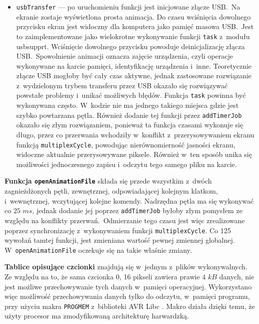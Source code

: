 \begin{itemize}
	\item \texttt{usbTransfer} --- po uruchomieniu funkcji jest inicjowane złącze USB.~Na ekranie zostaje wyświetlona prosta animacja. Do czasu wciśnięcia dowolnego przycisku ekran jest widoczny dla komputera jako pamięć masowa USB.~Jest to zaimplementowane jako wielokrotne wykonywanie funkcji \texttt{task} z~modułu usbsupprt. Wciśnięcie dowolnego przycisku powoduje deinicjalizację złącza USB.~Spowolnienie animacji oznacza zajęcie urządzenia, czyli operacje wykonywane na karcie pamięci, identyfikację urządzenia i~inne. Teoretycznie złącze USB mogłoby być cały czas aktywne, jednak zastosowane rozwiązanie z~wydzielonym trybem transferu przez USB okazało się rozwiązywać powstałe problemy i~unikać możliwych błędów. Funkcja \texttt{task} powinna być wykonywana często. W~kodzie nie ma jednego takiego miejsca gdzie jest szybko powtarzana pętla. Również dodanie tej funkcji przez \texttt{addTimerJob} okazało się złym rozwiązaniem, ponieważ ta funkcja czasami wykonuje się długo, przez co przerwania wchodziły w~konflikt z~przerysowywaniem ekranu funkcją \texttt{multiplexCycle}, powodując nierównomierność jasności ekranu, widoczne aktualnie przerysowywane piksele. Również w~ten sposób unika się możliwości jednoczesnego zapisu i~odczytu tego samego pliku na karcie.
\end{itemize}

\textbf{Funkcja \texttt{openAnimationFile}} składa się przede wszystkim z~dwóch zagnieżdżonych pętli, zewnętrznej, odpowiadającej kolejnym klatkom, i~wewnętrznej, wczytującej kolejne komendy. Nadrzędna pętla ma się wykonywać co $25$ $ms$, jednak dodanie jej poprzez \texttt{addTimerJob} byłoby złym pomysłem ze względu na konflikty przerwań.~Odmierzanie tego czasu jest więc zrealizowane poprzez synchronizację z~wykonywaniem funkcji \texttt{multiplexCycle}. Co 125 wywołań tamtej funkcji, jest zmieniana wartość pewnej zmiennej globalnej. W~\texttt{openAnimationFile} oczekuje się na takie właśnie zmiany.

\textbf{Tablice opisujące czcionki} znajdują się w~jednym z~plików wykonywalnych. Ze względu na to, że sama czcionka 0, 16 pikseli zawiera prawie $4$ $kB$ danych, nie jest możliwe przechowywanie tych danych w~pamięci operacyjnej. Wykorzystano więc możliwość przechowywania danych tylko do odczytu, w~pamięci programu, przy użyciu makra \texttt{PROGMEM} z~biblioteki AVR Libc \cite{progmem}. Makro działa dzięki temu, że użyty procesor ma zmodyfikowaną architekturę harwardzką.

